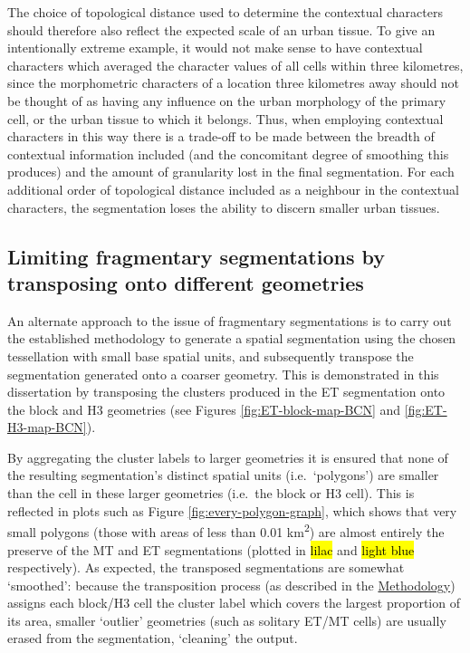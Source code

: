 \documentclass[a4paper, nobind]{templates/ociamthesis}
\begin{document}
The choice of topological distance used to determine the contextual characters should therefore also reflect the expected scale of an urban tissue. To give an intentionally extreme example, it would not make sense to have contextual characters which averaged the character values of all cells within three kilometres, since the morphometric characters of a location three kilometres away should not be thought of as having any influence on the urban morphology of the primary cell, or the urban tissue to which it belongs. Thus, when employing contextual characters in this way there is a trade-off to be made between the breadth of contextual information included (and the concomitant degree of smoothing this produces) and the amount of granularity lost in the final segmentation. For each additional order of topological distance included as a neighbour in the contextual characters, the segmentation loses the ability to discern smaller urban tissues.

\hypertarget{limiting-fragmentary-segmentations-by-transposing-onto-different-geometries}{%
\subsection{Limiting fragmentary segmentations by transposing onto different geometries}\label{limiting-fragmentary-segmentations-by-transposing-onto-different-geometries}}

An alternate approach to the issue of fragmentary segmentations is to carry out the established methodology to generate a spatial segmentation using the chosen tessellation with small base spatial units, and subsequently transpose the segmentation generated onto a coarser geometry. This is demonstrated in this dissertation by transposing the clusters produced in the ET segmentation onto the block and H3 geometries (see Figures \ref{fig:ET-block-map-BCN} and \ref{fig:ET-H3-map-BCN}).

By aggregating the cluster labels to larger geometries it is ensured that none of the resulting segmentation's distinct spatial units (i.e.~`polygons') are smaller than the cell in these larger geometries (i.e.~the block or H3 cell). This is reflected in plots such as Figure \ref{fig:every-polygon-graph}, which shows that very small polygons (those with areas of less than 0.01 km\textsuperscript{2}) are almost entirely the preserve of the MT and ET segmentations (plotted in \hl{lilac} and \hl{light blue} respectively). As expected, the transposed segmentations are somewhat `smoothed': because the transposition process (as described in the \protect\hyperlink{transposed-to-block-geometry}{Methodology}) assigns each block/H3 cell the cluster label which covers the largest proportion of its area, smaller `outlier' geometries (such as solitary ET/MT cells) are usually erased from the segmentation, `cleaning' the output.
\end{document}
